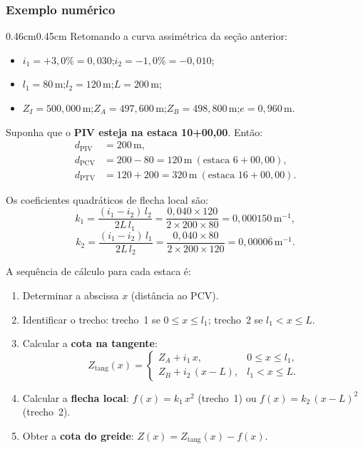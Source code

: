 \documentclass[12pt,letterpaper]{article}
\newenvironment{corpo}{\begin{adjustwidth}{0.46cm}{0.45cm}\justifying}{\end{adjustwidth}}
\begin{document}
\subsubsection*{Exemplo numérico}

\begin{corpo}
Retomando a curva assimétrica da seção anterior:
\begin{itemize}
  \item $i_1 = +3{,}0\% = 0{,}030$;\quad $i_2 = -1{,}0\% = -0{,}010$;
  \item $l_1 = 80\,\text{m}$;\quad $l_2 = 120\,\text{m}$;\quad $L = 200\,\text{m}$;
  \item $Z_I = 500{,}000\,\text{m}$;\quad $Z_A = 497{,}600\,\text{m}$;\quad $Z_B = 498{,}800\,\text{m}$;\quad $e = 0{,}960\,\text{m}$.
\end{itemize}

Suponha que o \textbf{PIV esteja na estaca 10+00,00}. Então:
\begin{align*}
 d_{\mathrm{PIV}} &= 200\,\text{m},\\
 d_{\mathrm{PCV}} &= 200 - 80 = 120\,\text{m}\ (\text{estaca }6{+}00{,}00),\\
 d_{\mathrm{PTV}} &= 120 + 200 = 320\,\text{m}\ (\text{estaca }16{+}00{,}00).
\end{align*}

Os coeficientes quadráticos de flecha local são:
\[
 k_1 = \frac{(i_1-i_2)\,l_2}{2L\,l_1} = \frac{0{,}040 \times 120}{2 \times 200 \times 80} = 0{,}000150\,\text{m}^{-1},
\]
\[
 k_2 = \frac{(i_1-i_2)\,l_1}{2L\,l_2} = \frac{0{,}040 \times 80}{2 \times 200 \times 120} = 0{,}0000\overline{6}\,\text{m}^{-1}.
\]

A sequência de cálculo para cada estaca é:
\begin{enumerate}
  \item Determinar a abscissa $x$ (distância ao PCV).
  \item Identificar o trecho: trecho~1 se $0 \le x \le l_1$; trecho~2 se $l_1 < x \le L$.
  \item Calcular a \textbf{cota na tangente}:
        \[
          Z_{\mathrm{tang}}(x) = \begin{cases}
            Z_A + i_1\,x, & 0 \le x \le l_1,\\
            Z_B + i_2\,(x - L), & l_1 < x \le L.
          \end{cases}
        \]
  \item Calcular a \textbf{flecha local}: $f(x) = k_1\,x^2$ (trecho~1) ou $f(x) = k_2\,(x-L)^2$ (trecho~2).
  \item Obter a \textbf{cota do greide}: $Z(x) = Z_{\mathrm{tang}}(x) - f(x)$.
\end{enumerate}


\end{corpo}
\end{document}
